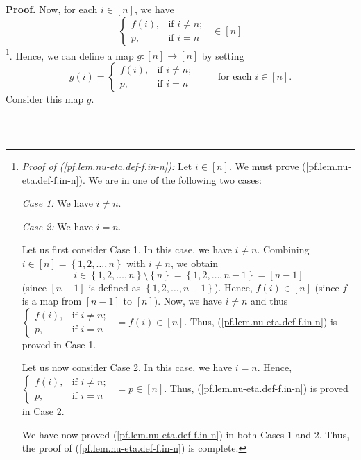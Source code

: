 \documentclass[numbers=enddot,12pt,final,onecolumn,notitlepage,english]{scrartcl}%
\theoremstyle{definition}
\newenvironment{proof}[1][Proof]{\noindent\textbf{#1.} }{\ \rule{0.5em}{0.5em}}
\newenvironment{verlong}{}{}
\begin{document}
\begin{verlong}
\begin{proof}
Now, for each $i\in\left[  n\right]  $, we have%
\begin{equation}%
\begin{cases}
f\left(  i\right)  , & \text{if }i\neq n;\\
p, & \text{if }i=n
\end{cases}
\ \ \in\left[  n\right]  \label{pf.lem.nu-eta.def-f.in-n}%
\end{equation}
\footnote{\textit{Proof of (\ref{pf.lem.nu-eta.def-f.in-n}):} Let $i\in\left[
n\right]  $. We must prove (\ref{pf.lem.nu-eta.def-f.in-n}). We are in one of
the following two cases:
\par
\textit{Case 1:} We have $i\neq n$.
\par
\textit{Case 2:} We have $i=n$.
\par
Let us first consider Case 1. In this case, we have $i\neq n$. Combining
$i\in\left[  n\right]  =\left\{  1,2,\ldots,n\right\}  $ with $i\neq n$, we
obtain%
\[
i\in\left\{  1,2,\ldots,n\right\}  \setminus\left\{  n\right\}  =\left\{
1,2,\ldots,n-1\right\}  =\left[  n-1\right]
\]
(since $\left[  n-1\right]  $ is defined as $\left\{  1,2,\ldots,n-1\right\}
$). Hence, $f\left(  i\right)  \in\left[  n\right]  $ (since $f$ is a map from
$\left[  n-1\right]  $ to $\left[  n\right]  $). Now, we have $i\neq n$ and
thus $%
\begin{cases}
f\left(  i\right)  , & \text{if }i\neq n;\\
p, & \text{if }i=n
\end{cases}
\ \ =f\left(  i\right)  \in\left[  n\right]  $. Thus,
(\ref{pf.lem.nu-eta.def-f.in-n}) is proved in Case 1.
\par
Let us now consider Case 2. In this case, we have $i=n$. Hence, $%
\begin{cases}
f\left(  i\right)  , & \text{if }i\neq n;\\
p, & \text{if }i=n
\end{cases}
\ \ =p\in\left[  n\right]  $. Thus, (\ref{pf.lem.nu-eta.def-f.in-n}) is proved
in Case 2.
\par
We have now proved (\ref{pf.lem.nu-eta.def-f.in-n}) in both Cases 1 and 2.
Thus, the proof of (\ref{pf.lem.nu-eta.def-f.in-n}) is complete.}. Hence, we
can define a map $g:\left[  n\right]  \rightarrow\left[  n\right]  $ by
setting%
\[
g\left(  i\right)  =%
\begin{cases}
f\left(  i\right)  , & \text{if }i\neq n;\\
p, & \text{if }i=n
\end{cases}
\ \ \ \ \ \ \ \ \ \ \text{for each }i\in\left[  n\right]  .
\]
Consider this map $g$.


\end{proof}
\end{verlong}
\end{document}
